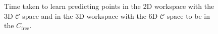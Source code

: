 \documentclass{beamer}
\begin{document}
\begin{frame}
\begin{figure}[!ht]
\begin{subfigure}[t]{0.49\textwidth}
		  \end{subfigure}   
		\caption{Time taken to learn predicting points  
		in the 2D workspace with the 3D $\mathcal{C}$-space
		and in the 3D workspace with the 6D $\mathcal{C}$-space 
		to be in the \(C_{\text{free}}\).} 
	  \end{figure}
\end{frame}	

 
		   

 
\end{document}
